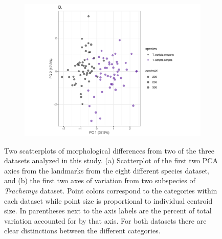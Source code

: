 \documentclass[fleqn,10pt,lineno]{wlpeerj} %
\begin{document}
\begin{figure}[h]
  \begin{subfigure}[b]{0.7\textwidth}
    \caption{}
    \includegraphics[width = \textwidth]{figure/tra_pc_graph}
  \end{subfigure}
  \caption{Two scatterplots of morphological differences from two of the three datasets analyzed in this study. (a) Scatterplot of the first two PCA axies from the landmarks from the eight different species dataset, and (b) the first two axes of variation from two subspecies of \textit{Trachemys} dataset. Point colors correspond to the categories within each dataset while point size is proportional to individual centroid size. In parentheses next to the axis labels are the percent of total variation accounted for by that axis. For both datasets there are clear distinctions between the different categories.}
  \label{fig:other_pca}
\end{figure}
\end{document}
